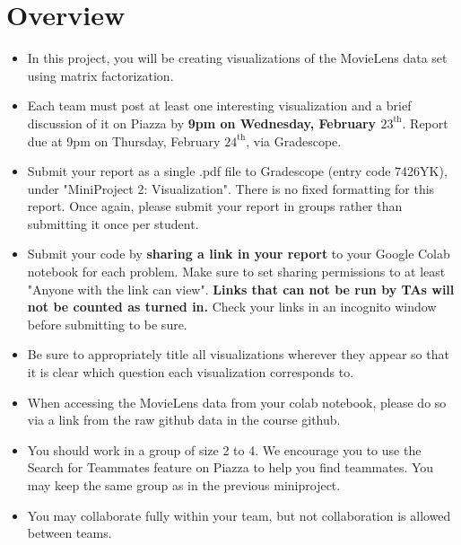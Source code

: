\newif\ifshowsolutions
\showsolutionstrue





\pagestyle{fancy}

\section{Overview}
\begin{itemize}
	\item In this project, you will be creating visualizations of the MovieLens data set using matrix factorization.
	\item Each team must post at least one interesting visualization and a brief discussion of it on Piazza by \textbf{9pm on Wednesday, February $23^{\text{th}}$}. Report due at 9pm on Thursday, February $24^{\text{th}}$, via Gradescope.   
	\item Submit your report as a single .pdf file to Gradescope (entry code 7426YK), under "MiniProject 2: Visualization". There is no fixed formatting for this report. Once again, please submit your report in groups rather than submitting it once per student.
	 \item Submit your code by \textbf{sharing a link in your report} to your Google Colab notebook for each problem. Make sure to set sharing permissions to at least "Anyone with the link can view". \textbf{Links that can not be run by TAs will not be counted as turned in.} Check your links in an incognito window before submitting to be sure.
    \item Be sure to appropriately title all visualizations wherever they appear so that it is clear which question each visualization corresponds to.
    \item When accessing the MovieLens data from your colab notebook, please do so via a link from the raw github data in the course github.
	\item You should work in a group of size 2 to 4. We encourage you to use the Search for Teammates feature on Piazza to help you find teammates. You may keep the same group as in the previous miniproject.
	\item You may collaborate fully within your team, but not collaboration is allowed between teams.
\end{itemize}

